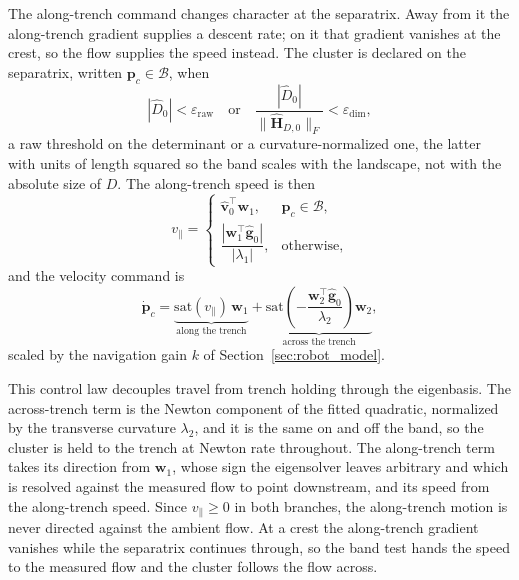 \documentclass[lettersize,journal]{IEEEtran}
\begin{document}
The along-trench command changes character at the separatrix. Away from
it the along-trench gradient supplies a descent rate; on it that
gradient vanishes at the crest, so the flow supplies the speed instead.
The cluster is declared
on the separatrix, written $\mathbf{p}_c \in \mathcal{B}$, when
\begin{equation}
    |\hat{D}_0| < \varepsilon_{\mathrm{raw}}
    \quad\text{or}\quad
    \frac{|\hat{D}_0|}{\|\hat{\mathbf{H}}_{D,0}\|_F}
        < \varepsilon_{\dim},
\end{equation}
a raw threshold on the determinant or a curvature-normalized one, the
latter with units of length squared so the band scales with the
landscape, not with the absolute size of $D$. The along-trench
speed is then
\begin{equation}
    v_\parallel =
    \begin{cases}
        \hat{\mathbf{v}}_0^\top \mathbf{w}_1,
            & \mathbf{p}_c \in \mathcal{B}, \\[6pt]
        \dfrac{|\mathbf{w}_1^\top \hat{\mathbf{g}}_0|}{|\lambda_1|},
            & \text{otherwise},
    \end{cases}
    \label{eq:vpar}
\end{equation}
and the velocity command is
\begin{equation}
    \dot{\mathbf{p}}_c =
    \underbrace{\mathrm{sat}(v_\parallel)\,\mathbf{w}_1}_{\text{along the trench}}
    + \underbrace{\mathrm{sat}\!\left(-\frac{\mathbf{w}_2^\top
      \hat{\mathbf{g}}_0}{\lambda_2}\right)\mathbf{w}_2}_{\text{across the trench}},
    \label{eq:d_law}
\end{equation}
scaled by the navigation gain $k$ of Section~\ref{sec:robot_model}.

This control law decouples travel from trench holding through the
eigenbasis.
The across-trench term is the Newton component of the fitted quadratic,
normalized by the transverse curvature $\lambda_2$, and it is the same
on and off the band, so the cluster is held to the trench at Newton rate
throughout. The along-trench term takes its direction from
$\mathbf{w}_1$, whose sign the eigensolver leaves arbitrary and which is
resolved against the measured flow to point downstream, and its speed
from the along-trench speed. Since $v_\parallel \geq 0$ in both branches, the
along-trench motion is never directed against the ambient flow. At a
crest the along-trench gradient vanishes while the separatrix continues
through, so the band test hands the speed to the measured flow and the
cluster follows the flow across.
\end{document}
